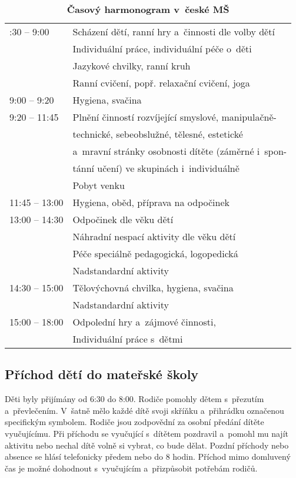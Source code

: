 		\begin{spacing}{1.0}
		\begin{table}[h!]
			\center
			\begin{tabular}{|l l|}
				\rowcolor{white}
				\hline
			6:30 – 9:00				& Scházení dětí, ranní hry a~činnosti dle volby dětí 	\\ 
									& Individuální práce, individuální péče o~děti\\
									& Jazykové chvilky, ranní kruh 	\\
									& Ranní cvičení, popř. relaxační cvičení, joga \\
			9:00 – 9:20				& Hygiena, svačina	\\
			9:20 – 11:45			& Plnění činností rozvíjející smyslové, manipulačně-	\\
									& technické, sebeobslužné, tělesné, estetické \\
									& a~mravní stránky osobnosti dítěte (záměrné i~spon- \\
									& tánní učení) ve skupinách i~individuálně \\
									& Pobyt venku					\\
			11:45 – 13:00			& Hygiena, oběd, příprava na odpočinek					\\
			13:00 – 14:30			& Odpočinek dle věku dětí						\\
									& Náhradní nespací aktivity dle věku dětí 				\\
									& Péče speciálně pedagogická, logopedická				\\ 
									& Nadstandardní aktivity 							 \\
			14:30 – 15:00			& Tělovýchovná chvilka, hygiena, svačina 			\\
									& Nadstandardní aktivity 		\\
			15:00 – 18:00			& Odpolední hry a~zájmové činnosti, \\
									& Individuální práce s~dětmi\\
			\hline
			\end{tabular}
			\caption{ \textbf{Časový harmonogram v~české MŠ}
			}
			\label{tab:rezimDneCR}
		\end{table}
		\end{spacing}

		\subsection{Příchod dětí do mateřské školy}
			
			Děti byly přijímány od 6:30 do 8:00. Rodiče pomohly dětem s~přezutím a~převlečením. V~šatně mělo každé dítě svoji skříňku a~přihrádku označenou specifickým symbolem. Rodiče jsou zodpovědní za osobní předání dítěte vyučujícímu. Při příchodu se vyučující s~dítětem pozdravil a~pomohl mu najít aktivitu nebo nechal dítě volně si vybrat, co bude dělat. Pozdní příchody nebo absence se hlásí telefonicky předem nebo do 8 hodin. Příchod mimo domluvený čas je možné dohodnout s~vyučujícím a~přizpůsobit potřebám rodičů.


